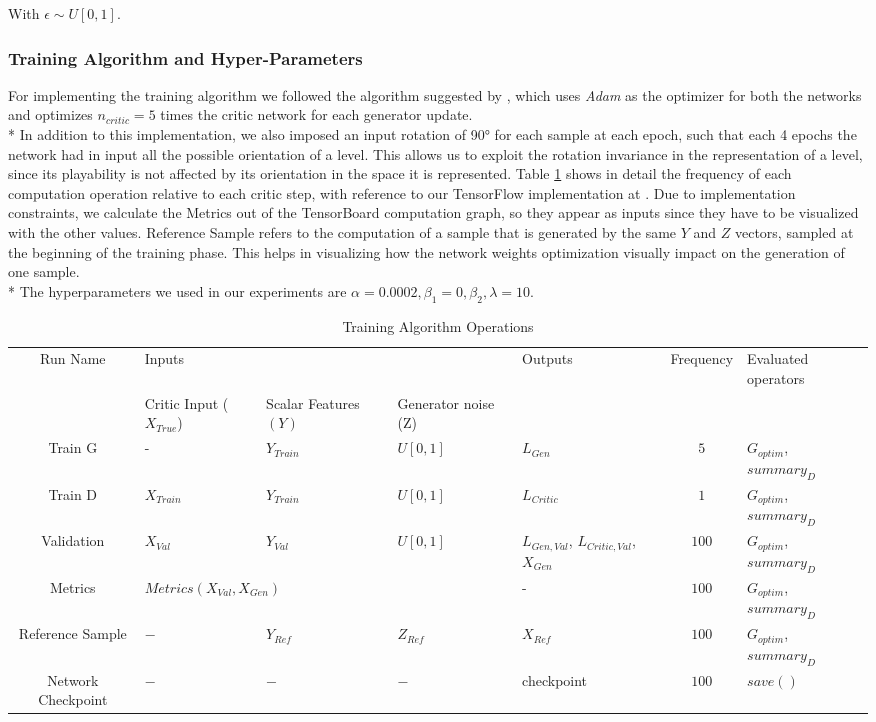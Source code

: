 With $ \epsilon \sim U[0,1] $. 

\subsubsection{Training Algorithm and Hyper-Parameters}
For implementing the training algorithm we followed the algorithm suggested by \cite[alg.~1. p.~4]{wgangp}, which uses \textit{Adam}\cite{adam} as the optimizer for both the networks and optimizes $n_{critic} = 5$ times the critic network for each generator update. \\*
In addition to this implementation, we also imposed an input rotation of 90° for each sample at each epoch, such that each 4 epochs the network had in input all the possible orientation of a level. This allows us to exploit the rotation invariance in the representation of a level, since its playability is not affected by its orientation in the space it is represented. Table \ref{tab:training} shows in detail the frequency of each computation operation relative to each critic step, with reference to our TensorFlow implementation at \cite{gitrepo}. Due to implementation constraints, we calculate the Metrics out of the TensorBoard computation graph, so they appear as inputs since they have to be visualized with the other values. Reference Sample refers to the computation of a sample that is generated by the same $Y$ and $Z$ vectors, sampled at the beginning of the training phase. This helps in visualizing how the network weights optimization visually impact on the generation of one sample. \\*
 The  hyperparameters we used in our experiments are $\alpha=0.0002, \beta_1=0, \beta_2, \lambda=10$.
 


\begin{table}[h!]
	\centering
	\begin{tabularx}{\textwidth}{| c | X | X | X | X | c | X | }
		\hline
		Run Name & \multicolumn{3}{X|}{Inputs} & Outputs & Frequency & Evaluated operators \\ \cline{2-4}
		  & Critic Input ($X_{True}$) & Scalar Features $(Y)$ & Generator noise (Z) &   &   &   \\
		\hline
		Train G & - & $Y_{Train}$ & $U[0,1]$ & $L_{Gen}$ & $5$ & $G_{optim}$, $summary_D$ \\ \hline
		Train D & $X_{Train}$ & $Y_{Train}$ & $U[0,1]$ & $L_{Critic}$ & $1$ & $G_{optim}$, $summary_D$\\ \hline
		Validation & $X_{Val}$ & $Y_{Val}$ & $U[0,1]$ &  $L_{Gen, Val}$, $L_{Critic, Val}$, $X_{Gen}$ & $100$ & $G_{optim}$, $summary_D$ \\ \hline
		Metrics & \multicolumn{3}{X|}{$Metrics(X_{Val}, X_{Gen})$} &  - & $100$ & $G_{optim}$, $summary_D$ \\ \hline
		Reference Sample & $-$ & $Y_{Ref}$ & $Z_{Ref}$ &  $X_{Ref}$ & $100$ & $G_{optim}$, $summary_D$ \\ \hline
		Network Checkpoint & $-$ & $-$ & $-$  & checkpoint & $100$ & $save()$ \\ \hline
	\end{tabularx}
	\caption{Training Algorithm Operations}
	\label{tab:training}
\end{table}

